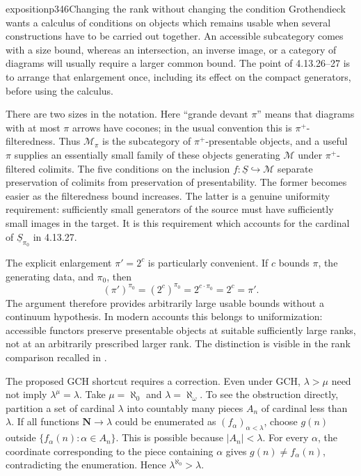 \begin{dcomment}{exposition}{p346}{Changing the rank without changing the condition}
Grothendieck wants a calculus of conditions on objects which remains usable when several constructions have to be carried out together. An accessible subcategory comes with a size bound, whereas an intersection, an inverse image, or a category of diagrams will usually require a larger common bound. The point of 4.13.26--27 is to arrange that enlargement once, including its effect on the compact generators, before using the calculus.

There are two sizes in the notation. Here ``grande devant $\pi$'' means that diagrams with at most $\pi$ arrows have cocones; in the usual convention this is $\pi^+$-filteredness. Thus $\mathcal M_\pi$ is the subcategory of $\pi^+$-presentable objects, and a useful $\pi$ supplies an essentially small family of these objects generating $\mathcal M$ under $\pi^+$-filtered colimits. The five conditions on the inclusion $f:\underline S\hookrightarrow\mathcal M$ separate preservation of colimits from preservation of presentability. The former becomes easier as the filteredness bound increases. The latter is a genuine uniformity requirement: sufficiently small generators of the source must have sufficiently small images in the target. It is this requirement which accounts for the cardinal of $\underline S_{\pi_0}$ in 4.13.27.

The explicit enlargement $\pi'=2^c$ is particularly convenient. If $c$ bounds $\pi$, the generating data, and $\pi_0$, then
\[
 (\pi')^{\pi_0}=(2^c)^{\pi_0}
 =2^{c\cdot\pi_0}=2^c=\pi'.
\]
The argument therefore provides arbitrarily large usable bounds without a continuum hypothesis. In modern accounts this belongs to uniformization: accessible functors preserve presentable objects at suitable sufficiently large ranks, not at an arbitrarily prescribed larger rank. The distinction is visible in the rank comparison recalled in \citet[Section 2]{BrookeTaylorRosicky2017}.

The proposed GCH shortcut requires a correction. Even under GCH, $\lambda>\mu$ need not imply $\lambda^\mu=\lambda$. Take $\mu=\aleph_0$ and $\lambda=\aleph_\omega$. To see the obstruction directly, partition a set of cardinal $\lambda$ into countably many pieces $A_n$ of cardinal less than $\lambda$. If all functions $\mathbf N\to\lambda$ could be enumerated as $(f_\alpha)_{\alpha<\lambda}$, choose $g(n)$ outside $\{f_\alpha(n):\alpha\in A_n\}$. This is possible because $|A_n|<\lambda$. For every $\alpha$, the coordinate corresponding to the piece containing $\alpha$ gives $g(n)\ne f_\alpha(n)$, contradicting the enumeration. Hence $\lambda^{\aleph_0}>\lambda$.


\end{dcomment}
